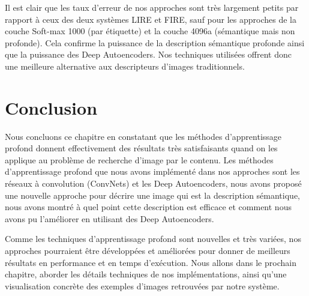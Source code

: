 	Il est clair que les taux d'erreur de nos approches sont très largement petits par rapport à ceux des deux systèmes LIRE et FIRE, sauf pour les approches de la couche Soft-max 1000 (par étiquette) et la couche 4096a (sémantique mais non profonde). Cela confirme la puissance de la description sémantique profonde ainsi que la puissance des Deep Autoencoders. Nos techniques utilisées offrent donc une meilleure alternative aux descripteurs d'images traditionnels.
	
\section{Conclusion}

	Nous concluons ce chapitre en constatant que les méthodes d'apprentissage profond donnent effectivement des résultats très satisfaisants quand on les applique au problème de recherche d'image par le contenu.
	Les méthodes d'apprentissage profond que nous avons implémenté dans nos approches sont les réseaux à convolution (ConvNets) et les Deep Autoencoders, nous avons proposé une nouvelle approche pour décrire une image qui est la description sémantique, nous avons montré à quel point cette description est efficace et comment nous avons pu l'améliorer en utilisant des Deep Autoencoders.
	
	Comme les techniques d'apprentissage profond sont nouvelles et très variées, nos approches pourraient être développées et améliorées pour donner de meilleurs résultats en performance et en temps d’exécution. Nous allons dans le prochain chapitre, aborder les détails techniques de nos implémentations, ainsi qu'une visualisation concrète des exemples d'images retrouvées par notre système.
